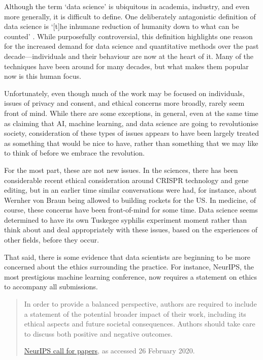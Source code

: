 \documentclass[
]{book}
\begin{document}
Although the term `data science' is ubiquitous in academia, industry, and even more generally, it is difficult to define. One deliberately antagonistic definition of data science is `{[}t{]}he inhumane reduction of humanity down to what can be counted' \citep{keyes2009}. While purposefully controversial, this definition highlights one reason for the increased demand for data science and quantitative methods over the past decade---individuals and their behaviour are now at the heart of it. Many of the techniques have been around for many decades, but what makes them popular now is this human focus.

Unfortunately, even though much of the work may be focused on individuals, issues of privacy and consent, and ethical concerns more broadly, rarely seem front of mind. While there are some exceptions, in general, even at the same time as claiming that AI, machine learning, and data science are going to revolutionise society, consideration of these types of issues appears to have been largely treated as something that would be nice to have, rather than something that we may like to think of before we embrace the revolution.

For the most part, these are not new issues. In the sciences, there has been considerable recent ethical consideration around CRISPR technology and gene editing, but in an earlier time similar conversations were had, for instance, about Wernher von Braun being allowed to building rockets for the US. In medicine, of course, these concerns have been front-of-mind for some time. Data science seems determined to have its own Tuskegee syphilis experiment moment rather than think about and deal appropriately with these issues, based on the experiences of other fields, before they occur.

That said, there is some evidence that data scientists are beginning to be more concerned about the ethics surrounding the practice. For instance, NeurIPS, the most prestigious machine learning conference, now requires a statement on ethics to accompany all submissions.

\begin{quote}
In order to provide a balanced perspective, authors are required to include a statement of the potential broader impact of their work, including its ethical aspects and future societal consequences. Authors should take care to discuss both positive and negative outcomes.

\href{https://neurips.cc/Conferences/2020/CallForPapers}{NeurIPS call for papers}, as accessed 26 February 2020.
\end{quote}
\end{document}
